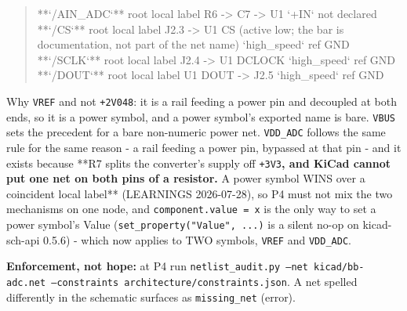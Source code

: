 \documentclass[11pt,a4paper]{article}
\begin{document}
\begin{quote}
\textbar{} {*}{*}`/AIN\_ADC`{*}{*} \textbar{} root local label \textbar{} R6 -\textgreater{} C7 -\textgreater{} U1 `+IN` \textbar{} not declared \textbar{}\\
\textbar{} {*}{*}`/CS`{*}{*} \textbar{} root local label \textbar{} J2.3 -\textgreater{} U1 CS (active low; the bar is documentation, not part of the net name) \textbar{} `high\_speed` ref GND \textbar{}\\
\textbar{} {*}{*}`/SCLK`{*}{*} \textbar{} root local label \textbar{} J2.4 -\textgreater{} U1 DCLOCK \textbar{} `high\_speed` ref GND \textbar{}\\
\textbar{} {*}{*}`/DOUT`{*}{*} \textbar{} root local label \textbar{} U1 DOUT -\textgreater{} J2.5 \textbar{} `high\_speed` ref GND \textbar{}
\end{quote}
Why \texttt{VREF} and not \texttt{+2V048}: it is a rail feeding a power pin and decoupled at both ends, so it is a power symbol, and a power symbol's exported name is bare. \texttt{VBUS} sets the precedent for a bare non-numeric power net. \texttt{VDD\_ADC} follows the same rule for the same reason - a rail feeding a power pin, bypassed at that pin - and it exists because {*}{*}R7 splits the converter's supply off \texttt{+3V3}\textbf{, and KiCad cannot put one net on both pins of a resistor. }A power symbol WINS over a coincident local label{*}{*} (LEARNINGS 2026-07-28), so P4 must not mix the two mechanisms on one node, and \texttt{component.value = x} is the only way to set a power symbol's Value (\texttt{set\_property("Value", ...)} is a silent no-op on kicad-sch-api 0.5.6) - which now applies to TWO symbols, \texttt{VREF} and \texttt{VDD\_ADC}.

\textbf{Enforcement, not hope:} at P4 run \texttt{netlist\_audit.py --net kicad/bb-adc.net --constraints architecture/constraints.json}. A net spelled differently in the schematic surfaces as \texttt{missing\_net} (error).
\end{document}
